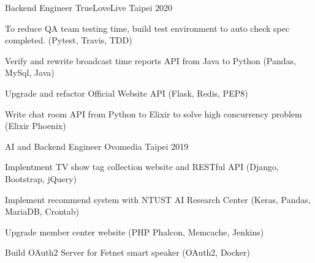 

\begin{cventries}

  \cventry
    {Backend Engineer} %
    {TrueLoveLive} %
    {Taipei} %
    {2020} %
    {
      \begin{cvitems} %
        \item {To reduce QA team testing time, build test environment to auto check spec completed. (Pytest, Travis, TDD)}
        \item {Verify and rewrite broadcast time reports API from Java to Python (Pandas, MySql, Java)}
        \item {Upgrade and refactor Official Website API (Flask, Redis, PEP8)}
        \item {Write chat room API from Python to Elixir to solve high concurrency problem (Elixir Phoenix)}
      \end{cvitems}
    }

  \cventry
    {AI and Backend Engineer} %
    {Ovomedia} %
    {Taipei} %
    {2019} %
    {
      \begin{cvitems} %
        \item {Implentment TV show tag collection website and RESTful API (Django, Bootstrap, jQuery)}
        \item {Implement recommend system with NTUST AI Research Center (Keras, Pandas, MariaDB, Crontab)}
        \item {Upgrade member center website (PHP Phalcon, Memcache, Jenkins)}
        \item {Build OAuth2 Server for Fetnet smart speaker (OAuth2, Docker)}
      \end{cvitems}
    }

\end{cventries}
